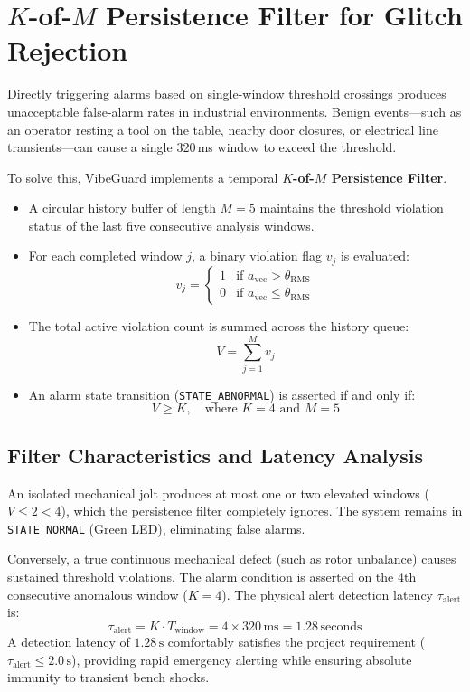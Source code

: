\section{$K$-of-$M$ Persistence Filter for Glitch Rejection}
Directly triggering alarms based on single-window threshold crossings produces unacceptable false-alarm rates in industrial environments. Benign events---such as an operator resting a tool on the table, nearby door closures, or electrical line transients---can cause a single 320\,ms window to exceed the threshold.

To solve this, VibeGuard implements a temporal \textbf{$K$-of-$M$ Persistence Filter}.
\begin{itemize}
    \item A circular history buffer of length $M = 5$ maintains the threshold violation status of the last five consecutive analysis windows.
    \item For each completed window $j$, a binary violation flag $v_j$ is evaluated:
    \begin{equation}
    v_j = \begin{cases} 
    1 & \text{if } a_{\mathrm{vec}} > \theta_{\mathrm{RMS}} \\
    0 & \text{if } a_{\mathrm{vec}} \le \theta_{\mathrm{RMS}}
    \end{cases}
    \end{equation}
    \item The total active violation count is summed across the history queue:
    \begin{equation}
    V = \sum_{j=1}^{M} v_j
    \end{equation}
    \item An alarm state transition (\texttt{STATE\_ABNORMAL}) is asserted if and only if:
    \begin{equation}
    V \ge K, \quad \text{where } K = 4 \text{ and } M = 5
    \end{equation}
\end{itemize}

\subsection{Filter Characteristics and Latency Analysis}
An isolated mechanical jolt produces at most one or two elevated windows ($V \le 2 < 4$), which the persistence filter completely ignores. The system remains in \texttt{STATE\_NORMAL} (Green LED), eliminating false alarms.

Conversely, a true continuous mechanical defect (such as rotor unbalance) causes sustained threshold violations. The alarm condition is asserted on the 4th consecutive anomalous window ($K = 4$). The physical alert detection latency $\tau_{\mathrm{alert}}$ is:
\begin{equation}
\tau_{\mathrm{alert}} = K \cdot T_{\mathrm{window}} = 4 \times 320\,\text{ms} = 1.28\,\text{seconds}
\end{equation}
A detection latency of $1.28\,\text{s}$ comfortably satisfies the project requirement ($\tau_{\mathrm{alert}} \le 2.0\,\text{s}$), providing rapid emergency alerting while ensuring absolute immunity to transient bench shocks.


